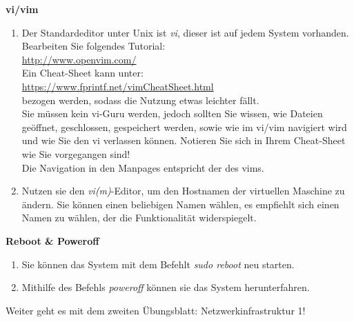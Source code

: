 \documentclass[paper=a4,fontsize=11pt]{scrartcl}%
\numberwithin{equation}{section}
\begin{document}
\begin{center}\Large{\textbf{vi/vim}}\end{center}\vskip0.25in
\begin{enumerate}
	\item Der Standardeditor unter Unix ist \emph{vi}, dieser ist auf jedem System vorhanden. Bearbeiten Sie folgendes Tutorial:\\
	\url{http://www.openvim.com/}\\
	Ein Cheat-Sheet kann unter:\\
	\url{https://www.fprintf.net/vimCheatSheet.html}\\
	bezogen werden, sodass die Nutzung etwas leichter fällt.\\
	Sie müssen kein vi-Guru werden, jedoch sollten Sie wissen, wie Dateien geöffnet, geschlossen, gespeichert werden, sowie wie im vi/vim navigiert wird und wie Sie den vi verlassen können. Notieren Sie sich in Ihrem Cheat-Sheet wie Sie vorgegangen sind!\\
	Die Navigation in den Manpages entspricht der des vims.
	\item Nutzen sie den \emph{vi(m)}-Editor, um den Hostnamen der virtuellen Maschine zu ändern. Sie können einen beliebigen Namen wählen, es empfiehlt sich einen Namen zu wählen, der die Funktionalität widerspiegelt.
\end{enumerate}

\begin{center}\Large{\textbf{Reboot \& Poweroff}}\end{center}\vskip0.25in
\begin{enumerate}
	\item Sie können das System mit dem Befehlt \emph{sudo reboot} neu starten.
	\item Mithilfe des Befehls \emph{poweroff} können sie das System herunterfahren.
\end{enumerate}

Weiter geht es mit dem zweiten Übungsblatt: Netzwerkinfrastruktur 1!
\end{document}
